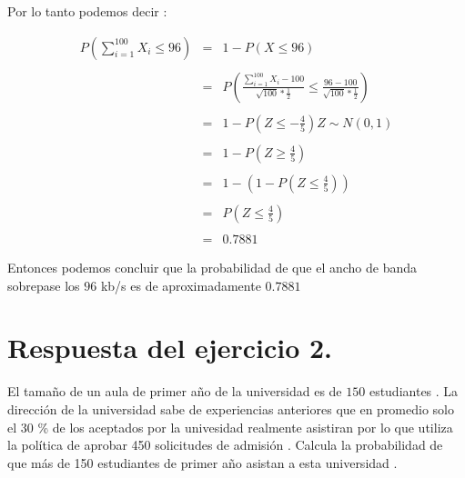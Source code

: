 \documentclass[10pt]{article}
\begin{document}
    \begin{flushleft}
   	    Por lo tanto podemos decir :
    \end{flushleft}
   	\begin{equation*}
		\begin{array}{rcl}
	   	    \displaystyle P\left(\sum_{i=1}^{100}X_{i} \leq 96\right) & = & 1 -  P\left(X \leq  96\right) 
	   	    \\
	   	    \\
	   	    & = &  \displaystyle P\left(\frac{\sum_{i=1}^{100}X_{i} - 100}{\sqrt{100}* \frac{1}{2}} \leq \frac{96 - 100}{\sqrt{100}* \frac{1}{2}}\right) 
	   	    \\
	   	    \\
	   	    & = &  \displaystyle 1 - P\left(Z \leq -\frac{4}{5}\right)Z \sim N(0,1)
	   	    \\
	   	    \\
	   	    & = &  \displaystyle 1 - P\left(Z \geq \frac{4}{5}\right)
	   	    \\
	   	    \\
	   	    & = &  \displaystyle 1 -\left( 1 - P\left(Z \leq \frac{4}{5}\right)\right)
	   	    \\
	   	    \\
	   	    & = &  \displaystyle P\left(Z \leq \frac{4}{5}\right)
	   	    \\
	   	    \\
	        & = & 0.7881
	    \end{array}
	\end{equation*}
	   
	\begin{flushleft}
		Entonces podemos concluir que la probabilidad de que el ancho de banda sobrepase los $96$  kb/s es de aproximadamente  $0.7881$
	\end{flushleft}

  	\section*{Respuesta del ejercicio 2.} 
   	\begin{flushleft}
   		El tama\~no de un aula de primer a\~no de la universidad es de $150$ estudiantes . La direcci\'on de la universidad sabe de experiencias anteriores que en promedio solo el 30 \% de los aceptados por la univesidad realmente asistiran por lo que utiliza la pol\'itica de aprobar 450 solicitudes de admisi\'on . Calcula  la probabilidad de que m\'as de 150 estudiantes de primer a\~no asistan a esta universidad .
   	\end{flushleft}
   
\end{document}

